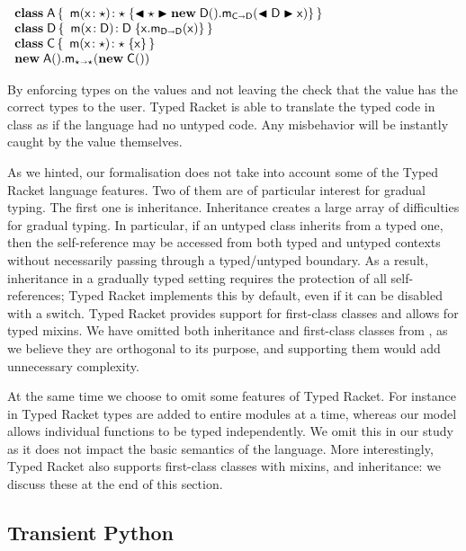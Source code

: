 \documentclass[acmlarge, anonymous, authordraft, review]{acmart} %
\begin{document}
\vspace{2mm}
\(
  \begin{array}{l}
  \Class{\xt A}{}{\Mdef\m\x\any\any{\BehCast\any{\KCall{\New\D{}}\m{\BehCast\D\x}{\C}\D }}} \\
  \Class\D{}{\Mdef\m\x\D\D{\KCall\x\m\x\D\D}} \\
  \Class{\C}{}{\Mdef\m\x{\any}{\any}{\x}} \\
  \KCall{\New{\xt A}{}}\m{\New{\xt C}{}}\any\any
  \end{array}
\)
\vspace{2mm}


\noindent By enforcing types on the values and not leaving the check that
the value has the correct types to the user. Typed Racket is able to
translate the typed code in class \D as if the language had no untyped
code. Any misbehavior will be instantly caught by the value themselves.



As we hinted, our formalisation does not take into account some of the Typed
Racket language features.  Two of them are of particular interest for
gradual typing.  The first one is inheritance.  Inheritance creates a large
array of difficulties for gradual typing.  In particular, if an untyped
class inherits from a typed one, then the self-reference may be accessed
from both typed and untyped contexts without necessarily passing through a
typed/untyped boundary. As a result, inheritance in a gradually typed
setting requires the protection of all self-references; Typed Racket
implements this by default, even if it can be disabled with a switch.  Typed
Racket provides support for first-class classes and allows for typed mixins.
We have omitted both inheritance and first-class classes from \kafka, as we
believe they are orthogonal to its purpose, and supporting them would add
unnecessary complexity.

At the same time we choose to omit some features of Typed Racket.  For
instance in Typed Racket types are added to entire modules at a time,
whereas our model allows individual functions to be typed independently.  We
omit this in our study as it does not impact the basic semantics of the
language.  More interestingly, Typed Racket also supports first-class
classes with mixins, and inheritance: we discuss these at the end of this
section.

\subsection{Transient Python}
\end{document}
